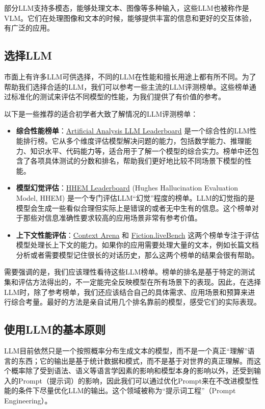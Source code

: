 \documentclass[../main.tex]{subfiles}
\begin{document}
部分LLM支持多模态，能够处理文本、图像等多种输入，这些LLM也被称作是VLM。它们在处理图像和文本的时候，能够提供丰富的信息和更好的交互体验，有广泛的应用。

\subsection{选择LLM}

市面上有许多LLM可供选择，不同的LLM在性能和擅长用途上都有所不同。为了帮助我们选择合适的LLM，我们可以参考一些主流的LLM评测榜单。这些榜单通过标准化的测试来评估不同模型的性能，为我们提供了有价值的参考。

以下是一些推荐的适合初学者大致了解情况的LLM评测榜单：

\begin{itemize}
  \item \textbf{综合性能榜单}：\href{https://artificialanalysis.ai/leaderboards/models}{Artificial Analysis LLM Leaderboard} 是一个综合性的LLM性能排行榜。它从多个维度评估模型解决问题的能力，包括数学能力、推理能力、知识水平、代码能力等，适合用于了解一个模型的综合实力。榜单中还包含了各项具体测试的分数和排名，帮助我们更好地比较不同场景下模型的性能。
  \item \textbf{模型幻觉评估}：\href{https://vectara-leaderboard.hf.space/}{HHEM Leaderboard} (Hughes Hallucination Evaluation Model, HHEM) 是一个专门评估LLM“幻觉”程度的榜单。LLM的幻觉指的是模型会生成一些看似合理但实际上是错误的或者无中生有的信息。这个榜单对于那些对信息准确性要求较高的应用场景非常有参考价值。
  \item \textbf{上下文性能评估}：\href{https://contextarena.ai/}{Context Arena} 和 \href{https://fiction.live/stories/Fiction-liveBench-May-22-2025/oQdzQvKHw8JyXbN87}{Fiction.liveBench} 这两个榜单专注于评估模型处理长上下文的能力。如果你的应用需要处理大量的文本，例如长篇文档分析或者需要模型记住很长的对话历史，那么这两个榜单的结果会很有帮助。
\end{itemize}

需要强调的是，我们应该理性看待这些LLM榜单。榜单的排名是基于特定的测试集和评估方法得出的，不一定能完全反映模型在所有场景下的表现。因此，在选择LLM时，除了参考榜单，我们还应该结合自己的具体需求、应用场景和预算来进行综合考量。最好的方法是亲自试用几个排名靠前的模型，感受它们的实际表现。

\subsection{使用LLM的基本原则}

LLM目前依然只是一个按照概率分布生成文本的模型，而不是一个真正“理解”语言的东西；它的输出是基于统计数据和模式，而不是基于对世界的真正理解。而这个概率除了受到语法、语义等语言学因素的影响和模型本身的影响以外，还受到输入的Prompt（提示词）的影响，因此我们可以通过优化Prompt来在不改进模型性能的条件下尽量优化LLM的输出。这个领域被称为“提示词工程”（Prompt Engineering）。
\end{document}

